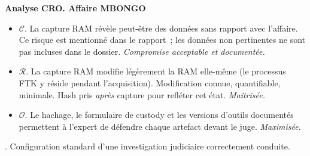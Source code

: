 \begin{boxCRO}
\textbf{Analyse CRO. Affaire MBONGO}

\begin{itemize}
    \item $\mathcal{C}$. La capture RAM révèle peut-être des données sans
          rapport avec l'affaire. Ce risque est mentionné dans le rapport~;
          les données non pertinentes ne sont pas incluses dans le dossier.
          \hfill\textit{Compromise acceptable et documentée.}

    \item $\mathcal{R}$. La capture RAM modifie légèrement la RAM
          elle-même (le processus FTK y réside pendant l'acquisition).
          Modification connue, quantifiable, minimale. Hash pris
          \emph{après} capture pour refléter cet état.
          \hfill\textit{Maîtrisée.}

    \item $\mathcal{O}$. Le hachage, le formulaire de custody et les
          versions d'outils documentés permettent à l'expert de défendre
          chaque artefact devant le juge.
          \hfill\textit{Maximisée.}
\end{itemize}

.
Configuration standard d'une investigation judiciaire correctement conduite.
\end{boxCRO}

\separateur

